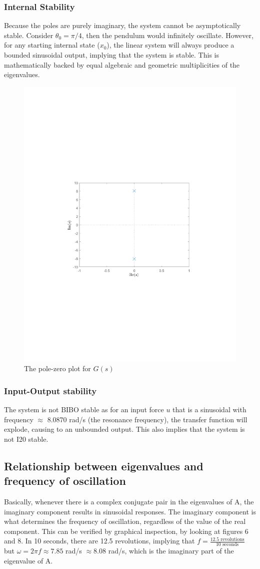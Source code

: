 \documentclass[10pt]{article}
\begin{document}
\subsubsection{Internal Stability}
Because the poles are purely imaginary, the system cannot be asymptotically stable. Consider $\theta_0 = \pi/4$, then the pendulum would infinitely oscillate. However, for any starting internal state ($x_0$), the linear system will always produce a bounded sinusoidal output, implying that the system is stable. This is mathematically backed by equal algebraic and geometric multiplicities of the eigenvalues.

\begin{figure}[ht]
    \centering
        \includegraphics[clip, trim=4.3cm 8.3cm 4.5cm 9.3cm,width=0.45\linewidth]{lab1/figs/section6_pole_zero_gs.pdf}
        \caption{The pole-zero plot for $G(s)$}
\end{figure}

\subsubsection{Input-Output stability}
The system is not BIBO stable as for an input force $u$ that is a sinusoidal with frequency $\approx$ 8.0870 rad/s (the resonance frequency), the transfer function will explode, causing to an unbounded output. This also implies that the system is not I20 stable.  

\subsection{Relationship between eigenvalues and frequency of oscillation}
Basically, whenever there is a complex conjugate pair in the eigenvalues of A, the imaginary component results in sinusoidal responses. The imaginary component is what determines the frequency of oscillation, regardless of the value of the real component. This can be verified by graphical inspection, by looking at figures 6 and 8. In 10 seconds, there are 12.5 revolutions, implying that $f = \frac{12.5 \text{ revolutions}}{10 \text{ seconds}}$ but $\omega = 2\pi f \approx 7.85$ rad/s $\approx 8.08$ rad/s, which is the imaginary part of the eigenvalue of A.
\end{document}
